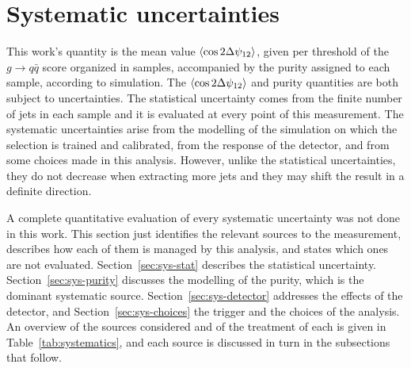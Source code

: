 \section{Systematic uncertainties}
\label{sec:systematic}

This work's quantity is the mean value $\langle \cos 2\Delta\psi_{12} \rangle$, given per threshold of 
the $g \to q\bar{q}$ score organized in samples, accompanied by the purity assigned to each
sample, according to simulation. The $\langle \cos 2\Delta\psi_{12} \rangle$ and purity quantities are both
subject to uncertainties. The statistical uncertainty comes from the finite number of jets 
in each sample and it is evaluated at every point of this measurement. The systematic 
uncertainties arise from the modelling of the simulation on which the selection is trained and
calibrated, from the response of the detector, and from some choices made in this analysis. 
However, unlike the statistical uncertainties, they do not decrease when extracting more jets
and they may shift the result in a definite direction.

A complete quantitative evaluation of every systematic uncertainty was not done in this work.
This section just identifies the relevant sources to the measurement, describes how each of them
is managed by this analysis, and states which ones are not evaluated. Section~\ref{sec:sys-stat} describes the statistical uncertainty.
Section~\ref{sec:sys-purity} discusses the modelling of the purity, which is the
dominant systematic source. Section~\ref{sec:sys-detector} addresses the effects
of the detector, and Section~\ref{sec:sys-choices} the trigger and the choices of
the analysis. An overview of the sources considered and of the treatment of each is given in
Table~\ref{tab:systematics}, and each source is discussed in turn in the
subsections that follow.

